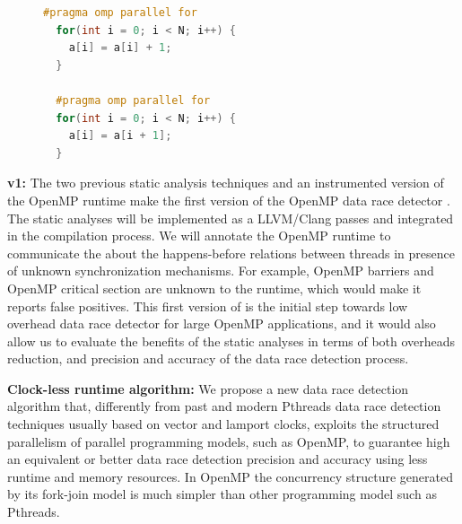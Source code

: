 \begin{figure}
  \vspace{-2ex}
  \begin{lstlisting}[language=C++, caption=OpenMP loops with and without loop-carried data dependency., label=code:example01]
  #pragma omp parallel for
  for(int i = 0; i < N; i++) {
    a[i] = a[i] + 1;
  }

  #pragma omp parallel for
  for(int i = 0; i < N; i++) {
    a[i] = a[i + 1];
  }
  \end{lstlisting}
\end{figure}

\textbf{\archer v1:} The two previous static analysis techniques and an
instrumented version of the OpenMP runtime make the first version of the
OpenMP data race detector \archer.
%
The static analyses will be implemented as a LLVM/Clang passes and integrated
in the compilation process.
%
We will annotate the OpenMP runtime to communicate the \tsan about the
happens-before relations between threads in presence of unknown
synchronization mechanisms.
%
For example, OpenMP barriers and OpenMP critical section are unknown to the
\tsan runtime, which would make it reports false positives.
%
This first version of \archer is the initial step towards low overhead data
race detector for large OpenMP applications, and it would also allow us to
evaluate the benefits of the static analyses in terms of both overheads
reduction, and precision and accuracy of the data race detection process.

\textbf{Clock-less runtime algorithm:} We propose a new data race detection
algorithm that, differently from past and modern Pthreads data race detection
techniques usually based on vector and lamport clocks, exploits the structured
parallelism of parallel programming models, such as OpenMP, to guarantee high
an equivalent or better data race detection precision and accuracy using less
runtime and memory resources.
%
In OpenMP the concurrency structure generated by its fork-join model is much
simpler than other programming model such as Pthreads.

